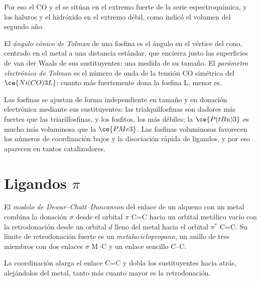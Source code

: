 Por eso el CO y el  se sitúan en el extremo fuerte de la serie espectroquímica, y
los haluros y el hidróxido en el extremo débil, como indicó el volumen del segundo año.

\begin{definition}\label{def:b3:organometallic-bonding:tolman}
El \emph{ángulo cónico de Tolman} de una fosfina es el ángulo
en el vértice del cono, centrado en el metal a una distancia estándar, que encierra justo
las superficies de van der Waals de sus sustituyentes: una medida de su tamaño.
El \emph{parámetro electrónico de Tolman} es el
número de onda de la tensión CO simétrica del $\ce{Ni(CO)3L}$: cuanto más fuertemente
dona la fosfina L, menor es.
\end{definition}

Las fosfinas se ajustan de forma independiente en tamaño y en donación electrónica mediante sus
sustituyentes: las trialquilfosfinas son dadores más fuertes que las triarilfosfinas, y
los fosfitos, los más débiles; la $\ce{P(tBu)3}$ es mucho más voluminosa que la $\ce{PMe3}$. Las fosfinas voluminosas favorecen
los números de coordinación bajos y la disociación rápida de ligandos, y por eso
aparecen en tantos catalizadores.

\section{Ligandos $\pi$}

\begin{definition}\label{def:b3:organometallic-bonding:dcd}
El \emph{modelo de Dewar--Chatt--Duncanson} del
enlace de un alqueno con un metal combina la donación $\sigma$ desde el orbital $\pi$ C=C
hacia un orbital metálico vacío con la retrodonación desde un orbital $d$ lleno del metal hacia
el orbital $\pi^*$ C=C. Su límite de retrodonación fuerte es un
\emph{metalaciclopropano}, un anillo de tres miembros
con dos enlaces $\sigma$ M--C y un enlace sencillo C--C.
\end{definition}

\begin{proposition}\label{prop:b3:organometallic-bonding:dcd}
La coordinación alarga el enlace C=C y dobla los sustituyentes hacia atrás, alejándolos
del metal, tanto más cuanto mayor es la retrodonación.
\end{proposition}

